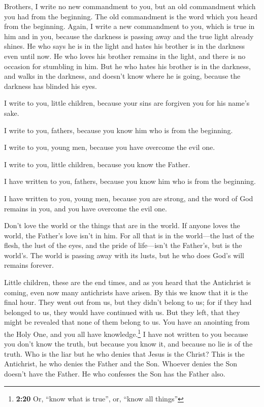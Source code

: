  Brothers, I write no new commandment to you, but an old
commandment which you had from the beginning. The old commandment is the
word which you heard from the beginning.  Again, I write a
new commandment to you, which is true in him and in you, because the
darkness is passing away and the true light already shines.
 He who says he is in the light and hates his brother is
in the darkness even until now.  He who loves his brother
remains in the light, and there is no occasion for stumbling in him.
 But he who hates his brother is in the darkness, and
walks in the darkness, and doesn't know where he is going, because the
darkness has blinded his eyes.

 I write to you, little children, because your sins are
forgiven you for his name's sake.

 I write to you, fathers, because you know him who is
from the beginning.

I write to you, young men, because you have overcome the evil one.

I write to you, little children, because you know the Father.

 I have written to you, fathers, because you know him who
is from the beginning.

I have written to you, young men, because you are strong, and the word
of God remains in you, and you have overcome the evil one.

 Don't love the world or the things that are in the
world. If anyone loves the world, the Father's love isn't in him.
 For all that is in the world---the lust of the flesh,
the lust of the eyes, and the pride of life---isn't the Father's, but is
the world's.  The world is passing away with its lusts,
but he who does God's will remains forever.

 Little children, these are the end times, and as you
heard that the Antichrist is coming, even now many antichrists have
arisen. By this we know that it is the final hour.  They
went out from us, but they didn't belong to us; for if they had belonged
to us, they would have continued with us. But they left, that they might
be revealed that none of them belong to us.  You have an
anointing from the Holy One, and you all have knowledge.\footnote{\textbf{2:20}
  Or, ``know what is true'', or, ``know all things''}  I
have not written to you because you don't know the truth, but because
you know it, and because no lie is of the truth.  Who is
the liar but he who denies that Jesus is the Christ? This is the
Antichrist, he who denies the Father and the Son. 
Whoever denies the Son doesn't have the Father. He who confesses the Son
has the Father also.

